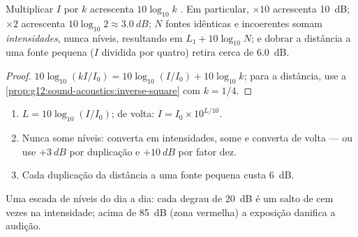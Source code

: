 \begin{proposition}\label{prop:g12:sound-acoustics:db-arithmetic}
Multiplicar $I$ por $k$ acrescenta $10\log_{10}k$ . Em
particular, $\times 10$ acrescenta \qty{10}{dB}; $\times 2$ acrescenta
$10\log_{10}2 \approx \qty{3.0}{dB}$; $N$ fontes idênticas e incoerentes
somam \emph{intensidades}, nunca níveis, resultando em
$L_1 + 10\log_{10}N$; e dobrar a distância a uma fonte pequena ($I$
dividida por quatro) retira cerca de \qty{6.0}{dB}.
\end{proposition}

\begin{proof}
$10\log_{10}(kI/I_0) = 10\log_{10}(I/I_0) + 10\log_{10}k$; para a
distância, use a \cref{prop:g12:sound-acoustics:inverse-square} com
$k = 1/4$.
\end{proof}

\begin{method}\label{met:g12:sound-acoustics:db}
\begin{enumerate}
  \item $L = 10\log_{10}(I/I_0)$; de volta: $I = I_0 \times 10^{L/10}$.
  \item Nunca some níveis: converta em intensidades, some e converta de
        volta --- ou use $+\qty{3}{dB}$ por duplicação e
        $+\qty{10}{dB}$ por fator dez.
  \item Cada duplicação da distância a uma fonte pequena custa
        \qty{6}{dB}.
\end{enumerate}
\end{method}

\begin{omfigure}

{\small Uma escada de níveis do dia a dia: cada degrau de \qty{20}{dB} é
um salto de cem vezes na intensidade; acima de \qty{85}{dB} (zona
vermelha) a exposição danifica a audição.}
\end{omfigure}

